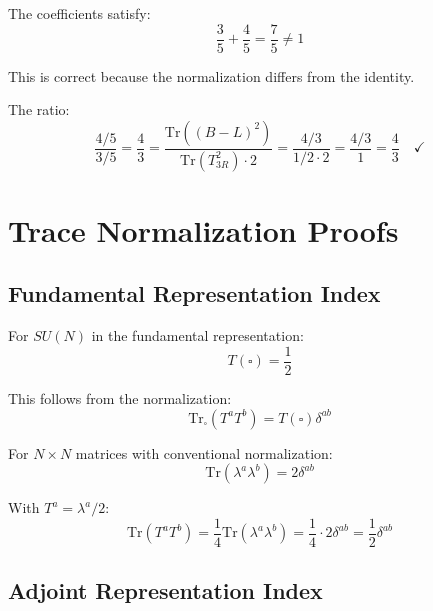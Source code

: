 \documentclass[11pt,a4paper]{article}
\begin{document}
The coefficients satisfy:
\begin{equation}
\label{eq:coeff-sum}
\frac{3}{5} + \frac{4}{5} = \frac{7}{5} \neq 1
\end{equation}

This is correct because the normalization differs from the identity.

The ratio:
\begin{equation}
\label{eq:coeff-ratio}
\frac{4/5}{3/5} = \frac{4}{3} = \frac{\mathrm{Tr}((B-L)^2)}{\mathrm{Tr}(T_{3R}^2) \cdot 2} = \frac{4/3}{1/2 \cdot 2} = \frac{4/3}{1} = \frac{4}{3} \quad \checkmark
\end{equation}

\section{Trace Normalization Proofs}
\label{app:trace-proofs}

\subsection{Fundamental Representation Index}
\label{app:fund-index}

For $SU(N)$ in the fundamental representation:
\begin{equation}
\label{eq:fund-index-def}
T(\square) = \frac{1}{2}
\end{equation}

This follows from the normalization:
\begin{equation}
\label{eq:generator-norm-proof}
\mathrm{Tr}_\square(T^a T^b) = T(\square) \delta^{ab}
\end{equation}

For $N \times N$ matrices with conventional normalization:
\begin{equation}
\label{eq:gell-mann-norm}
\mathrm{Tr}(\lambda^a \lambda^b) = 2\delta^{ab}
\end{equation}

With $T^a = \lambda^a / 2$:
\begin{equation}
\label{eq:t-from-lambda}
\mathrm{Tr}(T^a T^b) = \frac{1}{4} \mathrm{Tr}(\lambda^a \lambda^b) = \frac{1}{4} \cdot 2\delta^{ab} = \frac{1}{2}\delta^{ab}
\end{equation}

\subsection{Adjoint Representation Index}
\label{app:adj-index}
\end{document}
